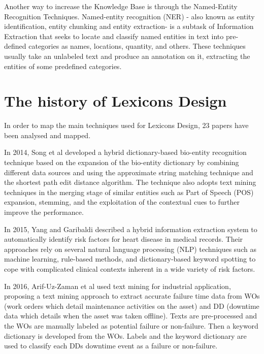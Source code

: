 \documentclass[]{book}
\theoremstyle{definition}
\theoremstyle{definition}
\theoremstyle{definition}
\theoremstyle{remark}
\begin{document}
Another way to increase the Knowledge Base is through the Named-Entity
Recognition Techniques. Named-entity recognition (NER) - also known as
entity identification, entity chunking and entity extraction- is a
subtask of Information Extraction that seeks to locate and classify
named entities in text into pre-defined categories as names, locations,
quantity, and others. These techniques usually take an unlabeled text
and produce an annotation on it, extracting the entities of some
predefined categories.

\section{The history of Lexicons
Design}\label{the-history-of-lexicons-design}

In order to map the main techniques used for Lexicons Design, 23 papers
have been analysed and mapped.

In 2014, Song et al \citep{song2015developing} developed a hybrid
dictionary-based bio-entity recognition technique based on the expansion
of the bio-entity dictionary by combining different data sources and
using the approximate string matching technique and the shortest path
edit distance algorithm. The technique also adopts text mining
techniques in the merging stage of similar entities such as Part of
Speech (POS) expansion, stemming, and the exploitation of the contextual
cues to further improve the performance.

In 2015, Yang and Garibaldi \citep{yang2015hybrid} described a hybrid
information extraction system to automatically identify risk factors for
heart disease in medical records. Their approaches rely on several
natural language processing (NLP) techniques such as machine learning,
rule-based methods, and dictionary-based keyword spotting to cope with
complicated clinical contexts inherent in a wide variety of risk
factors.

In 2016, Arif-Uz-Zaman et al \citep{arif2017extracting} used text mining
for industrial application, proposing a text mining approach to extract
accurate failure time data from WOs (work orders which detail
maintenance activities on the asset) and DD (downtime data which details
when the asset was taken offline). Texts are pre-processed and the WOs
are manually labeled as potential failure or non-failure. Then a keyword
dictionary is developed from the WOs. Labels and the keyword dictionary
are used to classify each DDs downtime event as a failure or
non-failure.
\end{document}
